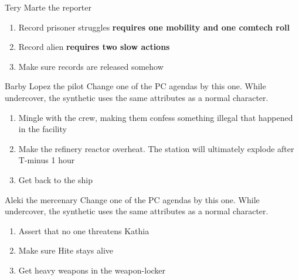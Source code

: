 \begin{rpg-commentbox}{Tery Marte the reporter}
    \begin{enumerate}[label=\textbf{Act \arabic*}, leftmargin=1cm]
        \item Record prisoner struggles \textbf{requires one mobility and one comtech roll}
        \item Record alien \textbf{requires two slow actions}
        \item Make sure records are released somehow
    \end{enumerate}
\end{rpg-commentbox}



\begin{rpg-commentbox}{Barby Lopez the pilot}
    Change one of the PC agendas by this one. While undercover, the synthetic uses the same attributes as a normal character.

    \begin{enumerate}[label=\textbf{Act \arabic*}, leftmargin=1cm]
        \item Mingle with the crew, making them confess something illegal that happened in the facility
        \item Make the refinery reactor overheat. The station will ultimately explode after T-minus 1 hour
        \item Get back to the ship
    \end{enumerate}
\end{rpg-commentbox}


\begin{rpg-commentbox}{Aleki the mercenary}
    Change one of the PC agendas by this one. While undercover, the synthetic uses the same attributes as a normal character.

    \begin{enumerate}[label=\textbf{Act \arabic*}, leftmargin=1cm]
        \item Assert that no one threatens Kathia
        \item Make sure Hite stays alive
        \item Get heavy weapons in the weapon-locker
    \end{enumerate}
\end{rpg-commentbox}
